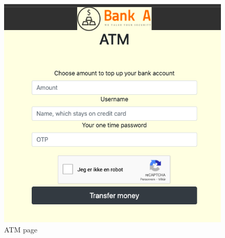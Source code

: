 \begin{figure}[H]
    \centering
    \includegraphics[width=\textwidth]{pics/atmPage.png}
    \caption{ATM page}
\end{figure}